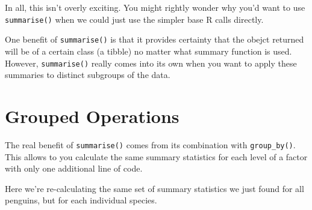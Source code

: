 \documentclass[
  letterpaper,
  DIV=11,
  numbers=noendperiod]{scrreprt}
\begin{document}
In all, this isn't overly exciting. You might rightly wonder why you'd
want to use \texttt{summarise()} when we could just use the simpler base
R calls directly.

One benefit of \texttt{summarise()} is that it provides certainty that
the obejct returned will be of a certain class (a tibble) no matter what
summary function is used. However, \texttt{summarise()} really comes
into its own when you want to apply these summaries to distinct
subgroups of the data.

\section{Grouped Operations}\label{grouped-operations}

The real benefit of \texttt{summarise()} comes from its combination with
\texttt{group\_by()}. This allows to you calculate the same summary
statistics for each level of a factor with only one additional line of
code.

Here we're re-calculating the same set of summary statistics we just
found for all penguins, but for each individual species.
\end{document}
